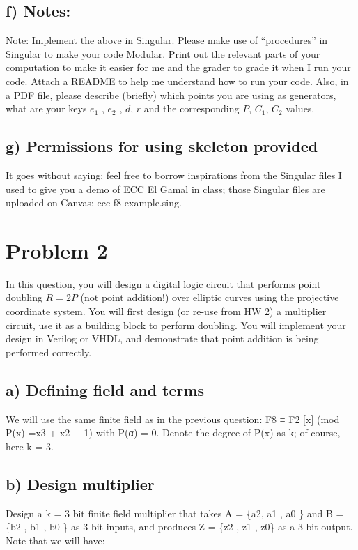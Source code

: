 \documentclass[a4paper,11pt]{exam}
\begin{document}
\subsection{f) Notes:}
\label{sec:orgab27071}
Note: Implement the above in Singular. Please make use of “procedures” in Singular to make your code Modular. Print out the relevant parts of your computation to make it easier for me and  the grader  to grade it when I run your code.  Attach a README to help me understand how to run your code.  Also,  in a PDF file, please  describe  (briefly)  which points you are using as generators, what are your keys \(e_1\) , \(e_2\) , \(d\), \(r\) and the corresponding \(P\), \(C_1\), \(C_2\) values. 

\subsection{g) Permissions for using skeleton provided}
\label{sec:org8cdbd85}
It goes without saying: feel free to borrow inspirations from the Singular files I used to give you a demo of ECC El Gamal in class; those Singular files are uploaded on Canvas: ecc-f8-example.sing.


\section{Problem 2}
\label{sec:orge58b6d4}
In this question, you will design a digital logic circuit that performs point doubling \(R = 2P\)  (not point addition!) over elliptic curves using the projective coordinate system. You will first design (or re-use from HW 2) a multiplier circuit, use it as a building block to perform doubling. You will implement your design in Verilog or VHDL, and demonstrate that point addition is being performed correctly.

\subsection{a) Defining field and terms}
\label{sec:org23554a5}
We will use the same finite field as in the previous question: F8 ≡ F2 [x] (mod P(x) =x3 + x2 + 1) with P(α) = 0. Denote the degree of P(x) as k; of course, here k = 3.

\subsection{b) Design multiplier}
\label{sec:org5bea844}
Design a k = 3 bit finite field multiplier that takes A = \{a2, a1 , a0 \} and B = \{b2 , b1 , b0 \} as 3-bit inputs, and produces Z = \{z2 , z1 , z0\} as a 3-bit output. Note that we will have:
\end{document}
